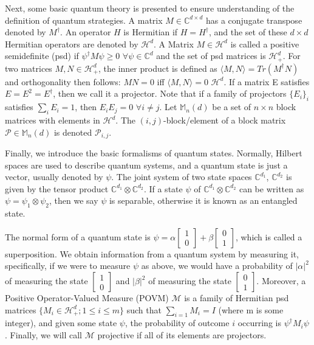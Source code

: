 \documentclass[12pt]{article}
\theoremstyle{definition}
\theoremstyle{proposition}
\theoremstyle{lemma}
\begin{document}
Next, some basic quantum theory is presented to ensure understanding of the definition of quantum strategies. A matrix $M \in \mathbb{C}^{d \times d}$ has a conjugate transpose denoted by $M^\dag$. An operator $H$ is Hermitian if $H = {H^{\dag}}$, and the set of these $d \times d$ Hermitian operators are denoted by $\mathcal{H}^d$. A Matrix $M \in \mathcal{H}^d$ is called a positive semidefinite (psd) if $\psi^\dag M \psi \geq 0$ $\forall \psi \in \mathbb{C}^d$ and the set of psd matrices is $\mathcal{H}^d_+$. For two matrices $M, N \in \mathcal{H}^d_+$, the inner product is defined as $\langle M, N\rangle = Tr(M^\dag N)$ and orthogonality then follows: $MN = 0$ iff $\langle M, N \rangle = 0$ $\mathcal{H}^d$. If a matrix E satisfies $E = E^2 = E^\dag$, then we call it a projector. Note that if a family of projectors $\{E_i\}_i$ satisfies $\sum_iE_i = 1$, then $E_iE_j = 0$ $\forall i \neq j$. Let $\mathbb{M}_n(d)$ be a set of $n \times n$ block matrices with elements in $\mathcal{H}^d$. The $(i, j)$-block/element of a block matrix $\mathcal{P} \in \mathbb{M}_n(d)$ is denoted $\mathcal{P}_{i, j}$.

Finally, we introduce the basic formalisms of quantum states. Normally, Hilbert spaces are used to describe quantum systems, and a quantum state is just a vector, usually denoted by $\psi$. The joint system of two state spaces $\mathbb{C}^{d_1}$, $\mathbb{C}^{d_2}$ is given by the tensor product $\mathbb{C}^{d_1} \otimes \mathbb{C}^{d_2}$. If a state $\psi$ of $\mathbb{C}^{d_1} \otimes \mathbb{C}^{d_2}$ can be written as $\psi = \psi_1 \otimes \psi_2$, then we say $\psi$ is separable, otherwise it is known as an entangled state.

The normal form of a quantum state is $\psi = \alpha \begin{bmatrix}
1 \\
0 
\end{bmatrix}
+ \beta
\begin{bmatrix}
0 \\
1
\end{bmatrix}
$, which is called a superposition. We obtain information from a quantum system by measuring it, specifically, if we were to measure $\psi$ as above, we would have a probability of $|\alpha|^2$ of measuring the state $\begin{bmatrix}
1 \\
0 
\end{bmatrix}$ and $|\beta|^2$ of measuring the state $\begin{bmatrix}
0 \\
1 
\end{bmatrix}$. Moreover, a Positive Operator-Valued Measure (POVM) $\mathcal{M}$ is a family of Hermitian psd matrices $\{ M_i \in \mathcal{H}^d_+; 1 \leq i \leq m \}$ such that $\sum_{i=1}M_i = I$ (where m is some integer), and given some state $\psi$, the probability of outcome $i$ occurring is $\psi^\dag M_i \psi$. Finally, we will call $\mathcal{M}$ projective if all of its elements are projectors.
\end{document}
